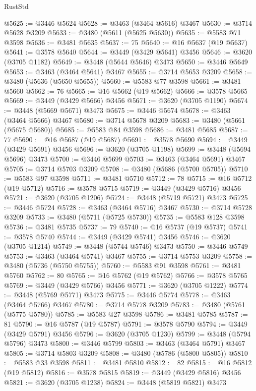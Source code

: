\begin{lexlean}{RustStd}
\begin{coremodule}
{\begin{coremodule}
{{{{{{{{{{{{{{{{{{{{{{{{{{{{{{{{{{{{{{{{{{{{{{{{{{{{{{{{{{{{{{{{{{{{{{{{{{{{{{{{{{{{{@5625 := @3446 @5624
@5628 := @3463 (@3464 @5616) @3467
@5630 := @3714 @5628 @3209
@5633 := @3480 (@5611 (@5625 @5630))
@5635 := @5583 @71 @3598
@5636 := @3481 @5635
@5637 := 75
@5640 := @16 @5637 (@19 @5637)
@5641 := @3578 @5640
@5644 := @3449 (@3429 @5641) @3456
@5646 := @3620 (@3705 @1182)
@5649 := @3448 (@5644 @5646) @3473
@5650 := @3446 @5649
@5653 := @3463 (@3464 @5641) @3467
@5655 := @3714 @5653 @3209
@5658 := @3480 (@5636 (@5650 @5655))
@5660 := @5583 @77 @3598
@5661 := @3481 @5660
@5662 := 76
@5665 := @16 @5662 (@19 @5662)
@5666 := @3578 @5665
@5669 := @3449 (@3429 @5666) @3456
@5671 := @3620 (@3705 @1190)
@5674 := @3448 (@5669 @5671) @3473
@5675 := @3446 @5674
@5678 := @3463 (@3464 @5666) @3467
@5680 := @3714 @5678 @3209
@5683 := @3480 (@5661 (@5675 @5680))
@5685 := @5583 @84 @3598
@5686 := @3481 @5685
@5687 := 77
@5690 := @16 @5687 (@19 @5687)
@5691 := @3578 @5690
@5694 := @3449 (@3429 @5691) @3456
@5696 := @3620 (@3705 @1198)
@5699 := @3448 (@5694 @5696) @3473
@5700 := @3446 @5699
@5703 := @3463 (@3464 @5691) @3467
@5705 := @3714 @5703 @3209
@5708 := @3480 (@5686 (@5700 @5705))
@5710 := @5583 @97 @3598
@5711 := @3481 @5710
@5712 := 78
@5715 := @16 @5712 (@19 @5712)
@5716 := @3578 @5715
@5719 := @3449 (@3429 @5716) @3456
@5721 := @3620 (@3705 @1206)
@5724 := @3448 (@5719 @5721) @3473
@5725 := @3446 @5724
@5728 := @3463 (@3464 @5716) @3467
@5730 := @3714 @5728 @3209
@5733 := @3480 (@5711 (@5725 @5730))
@5735 := @5583 @128 @3598
@5736 := @3481 @5735
@5737 := 79
@5740 := @16 @5737 (@19 @5737)
@5741 := @3578 @5740
@5744 := @3449 (@3429 @5741) @3456
@5746 := @3620 (@3705 @1214)
@5749 := @3448 (@5744 @5746) @3473
@5750 := @3446 @5749
@5753 := @3463 (@3464 @5741) @3467
@5755 := @3714 @5753 @3209
@5758 := @3480 (@5736 (@5750 @5755))
@5760 := @5583 @91 @3598
@5761 := @3481 @5760
@5762 := 80
@5765 := @16 @5762 (@19 @5762)
@5766 := @3578 @5765
@5769 := @3449 (@3429 @5766) @3456
@5771 := @3620 (@3705 @1222)
@5774 := @3448 (@5769 @5771) @3473
@5775 := @3446 @5774
@5778 := @3463 (@3464 @5766) @3467
@5780 := @3714 @5778 @3209
@5783 := @3480 (@5761 (@5775 @5780))
@5785 := @5583 @27 @3598
@5786 := @3481 @5785
@5787 := 81
@5790 := @16 @5787 (@19 @5787)
@5791 := @3578 @5790
@5794 := @3449 (@3429 @5791) @3456
@5796 := @3620 (@3705 @1230)
@5799 := @3448 (@5794 @5796) @3473
@5800 := @3446 @5799
@5803 := @3463 (@3464 @5791) @3467
@5805 := @3714 @5803 @3209
@5808 := @3480 (@5786 (@5800 @5805))
@5810 := @5583 @33 @3598
@5811 := @3481 @5810
@5812 := 82
@5815 := @16 @5812 (@19 @5812)
@5816 := @3578 @5815
@5819 := @3449 (@3429 @5816) @3456
@5821 := @3620 (@3705 @1238)
@5824 := @3448 (@5819 @5821) @3473
}}}}}}}}}}}}}}}}}}}}}}}}}}}}}}}}}}}}}}}}}}}}}}}}}}}}}}}}}}}}}}}}}}}}}}}}}}}}}}}}}}}}}
\end{coremodule}}
\end{coremodule}
\end{lexlean}
